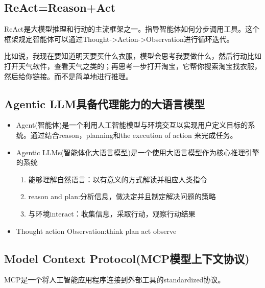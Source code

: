 \documentclass[UTF8]{ctexart}
\begin{document}
\subsection{ReAct=Reason+Act}


ReAct是大模型推理和行动的主流框架之一。指导智能体如何分步调用工具。这个框架规定智能体可以通过Thought->Action->Observation进行循环迭代。

比如说，我现在要知道明天要买什么衣服，模型会思考我要做什么，然后行动比如打开天气软件，查看天气之类的；再思考一步打开淘宝，它帮你搜索淘宝找衣服，然后给你链接。而不是简单地进行推理。
\subsection{Agentic LLM具备代理能力的大语言模型}

\begin{itemize}
    \item Agent(智能体)是一个利用人工智能模型与环境交互以实现用户定义目标的系统。通过结合reason，planning和the execution of action 来完成任务。
    \item Agentic LLMs(智能体化大语言模型)是一个使用大语言模型作为核心推理引擎的系统
    \begin{enumerate}
        \item 能够理解自然语言：以有意义的方式解读并相应人类指令
        \item reason and plan:分析信息，做决定并且制定解决问题的策略
        \item 与环境interact：收集信息，采取行动，观察行动结果
    \end{enumerate}
    \item Thought action Observation:think plan act observe
\end{itemize}


\subsection{Model Context Protocol(MCP模型上下文协议)}

MCP是一个将人工智能应用程序连接到外部工具的standardized协议。
\end{document}
